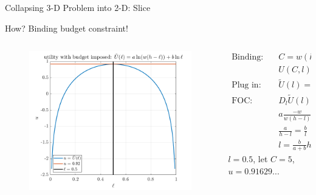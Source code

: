 \documentclass[11pt,aspectratio=169,usenames,dvipsnames]{beamer}
\begin{document}
\begin{frame}{Collapsing 3-D Problem into 2-D: Slice}
\label{slide:Collapsing_3_D_Problem_into_2_D_Slice}
\begin{center}
    How? Binding budget constraint!
\end{center}
\begin{columns}
    \begin{column}{0.5\textwidth}
        \begin{figure}
            \includegraphics[width=\textwidth]{./figures/UtilityBudget2C.png}
        \end{figure}
    \end{column}
    \begin{column}{0.5\textwidth}
        \begin{align*}
            \text{Binding:} \quad
                & C = w ( h-l )
            \\
                & U( C, l ) = a \ln C + b \ln l
            \\
            \text{Plug in:} \quad
                & \tilde{U}( l ) = a \ln ( w( h-l ) ) + b \ln l
            \\
            \text{FOC:} \quad
                & D_{l}\tilde{U}( l ) = 0
            \\
                & a \frac{-w}{w( h-l )} + b \frac{1}{l} = 0
            \\
                & \frac{a}{h-l} = \frac{b}{l}
            \\
                & l = \frac{b}{a+b} h
        \end{align*}
        $ l = 0.5 $, let $ C =  5$, $ u = 0.91629... $
    \end{column}
\end{columns}
\end{frame}
\end{document}
